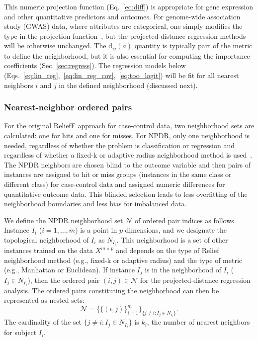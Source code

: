 \documentclass[10pt]{article}
\begin{document}
This numeric projection function (Eq.~\ref{eq:diff}) is appropriate for gene expression and other quantitative predictors and outcomes. For genome-wide association study (GWAS) data, where attributes are categorical, one simply modifies the type in the projection function~\cite{titv}, but the projected-distance regression methods will be otherwise unchanged. The $\text{d}_{ij}(a)$ quantity is typically part of the metric to define the neighborhood, but it is also essential for computing the importance coefficients (Sec. \ref{sec:regress}).  The regression models below (Eqs.~\ref{eq:lin_reg},~\ref{eq:lin_reg_cov},~\ref{eq:too_logit}) will be fit for all nearest neighbors $i$ and $j$ in the defined neighborhood (discussed next). 

\subsubsection{Nearest-neighbor ordered pairs}
For the original ReliefF approach for case-control data, two neighborhood sets are calculated: one for hits and one for misses. For NPDR, only one neighborhood is needed, regardless of whether the problem is classification or regression and regardless of whether a fixed-k or adaptive radius neighborhood method is used~\cite{greene09,urbanowicz17,mckinney13}. The NPDR neighbors are chosen blind to the outcome variable and then pairs of instances are assigned to hit or miss groups (instances in the same class or different class) for case-control data and assigned numeric differences for quantitative outcome data. This blinded selection leads to less overfitting of the neighborhood boundaries and less bias for imbalanced data.     

We define the NPDR neighborhood set $\mathcal{N}$ of ordered pair indices as follows. Instance $I_i$ ($i = 1,\dots,m$) is a point in $p$ dimensions, and we designate the topological neighborhood of $I_i$ as $N_{I_i}$. This neighborhood is a set of other instances trained on the data $X^{m \times p}$ and depends on the type of Relief neighborhood method (e.g., fixed-k or adaptive radius) and the type of metric (e.g., Manhattan or Euclidean). If instance $I_j$ is in the neighborhood of $I_i$ ($I_j \in N_{I_i}$), then the ordered pair $(i,j) \in \mathcal{N}$ for the projected-distance regression analysis. The ordered pairs constituting the neighborhood can then be represented as nested sets:
\begin{equation}\label{eq:N}
\mathcal{N}=\{\{(i, j)\}_{i=1}^{m}\}_{\{j \ne i : I_j \in N_{I_i}\}}.
\end{equation}
The cardinality of the set $\{j \ne i : I_j \in N_{I_i}\}$ is $k_i$, the number of nearest neighbors for subject $I_i$. 
\end{document}
